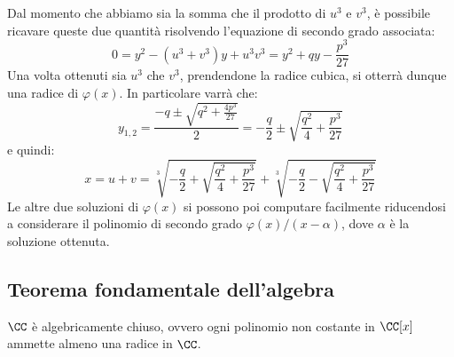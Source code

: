 \documentclass[11pt]{scrartcl}
\begin{document}
	
	Dal momento che abbiamo sia la somma che il prodotto di $u^3$ e $v^3$, è possibile
	ricavare queste due quantità risolvendo l'equazione di secondo grado
	associata:
	\[ 0 = y^2 - (u^3 + v^3) y + u^3 v^3 = y^2 + q y - \frac{p^3}{27} \]
	Una volta ottenuti sia $u^3$ che $v^3$, prendendone la radice cubica, si
	otterrà dunque una radice di $\varphi(x)$. In particolare varrà che:
	\[ y_{1,2} = \frac{-q \pm \sqrt{q^2 + \frac{4p^3}{27}}}{2} = -\frac{q}{2} \pm \sqrt{\frac{q^2}{4} + \frac{p^3}{27}} \]
	e quindi:
	\[ x = u + v = \sqrt[3]{-\frac{q}{2} + \sqrt{\frac{q^2}{4} + \frac{p^3}{27}}} + \sqrt[3]{-\frac{q}{2} - \sqrt{\frac{q^2}{4} + \frac{p^3}{27}}} \]
	Le altre due soluzioni di $\varphi(x)$ si possono poi computare facilmente riducendosi
	a considerare il polinomio di secondo grado $\varphi(x) / (x-\alpha)$, dove $\alpha$ è la soluzione
	ottenuta.
	
	\newpage
	\subsection{Teorema fondamentale dell'algebra}
	\begin{theorem}
		$\CC$ è algebricamente chiuso, ovvero ogni polinomio non costante in $\CC[x]$ ammette almeno una radice in $\CC$.
	\end{theorem}
	
\end{document}
